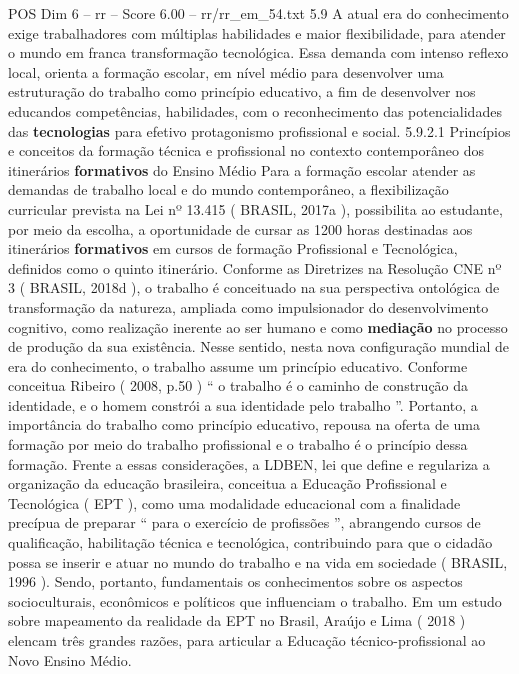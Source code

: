 \begin{textsample}{POS Dim 6 – rr – Score 6.00 – rr/rr\_em\_54.txt}  \label{ex:f6_pos_218}
5.9 A atual era do conhecimento exige trabalhadores com múltiplas habilidades e maior flexibilidade, para atender o mundo em franca transformação tecnológica.
Essa demanda com intenso reflexo local, orienta a formação escolar, em nível médio para desenvolver uma estruturação do trabalho como princípio educativo, a fim de desenvolver nos educandos competências, habilidades, com o reconhecimento das potencialidades das \textbf{tecnologias} para efetivo protagonismo profissional e social. 5.9.2.1 Princípios e conceitos da formação técnica e profissional no contexto contemporâneo dos itinerários \textbf{formativos} do Ensino Médio Para a formação escolar atender as demandas de trabalho local e do mundo contemporâneo, a flexibilização curricular prevista na Lei nº 13.415 ( BRASIL, 2017a ), possibilita ao estudante, por meio da escolha, a oportunidade de cursar as 1200 horas destinadas aos itinerários \textbf{formativos} em cursos de formação Profissional e Tecnológica, definidos como o quinto itinerário.
Conforme as Diretrizes na Resolução CNE nº 3 ( BRASIL, 2018d ), o trabalho é conceituado na sua perspectiva ontológica de transformação da natureza, ampliada como impulsionador do desenvolvimento cognitivo, como realização inerente ao ser humano e como \textbf{mediação} no processo de produção da sua existência.
Nesse sentido, nesta nova configuração mundial de era do conhecimento, o trabalho assume um princípio educativo.
Conforme conceitua Ribeiro ( 2008, p.50 ) “ o trabalho é o caminho de construção da identidade, e o homem constrói a sua identidade pelo trabalho ”.
Portanto, a importância do trabalho como princípio educativo, repousa na oferta de uma formação por meio do trabalho profissional e o trabalho é o princípio dessa formação.
Frente a essas considerações, a LDBEN, lei que define e regulariza a organização da educação brasileira, conceitua a Educação Profissional e Tecnológica ( EPT ), como uma modalidade educacional com a finalidade precípua de preparar “ para o exercício de profissões ”, abrangendo cursos de qualificação, habilitação técnica e tecnológica, contribuindo para que o cidadão possa se inserir e atuar no mundo do trabalho e na vida em sociedade ( BRASIL, 1996 ).
Sendo, portanto, fundamentais os conhecimentos sobre os aspectos socioculturais, econômicos e políticos que influenciam o trabalho.
Em um estudo sobre mapeamento da realidade da EPT no Brasil, Araújo e Lima ( 2018 ) elencam três grandes razões, para articular a Educação técnico-profissional ao Novo Ensino Médio.

\end{textsample}
